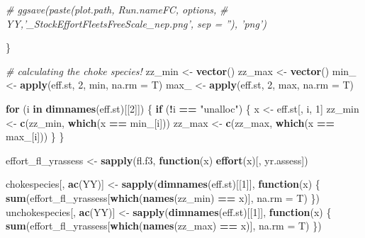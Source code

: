 \documentclass[
]{article}
\newenvironment{Shaded}{\begin{snugshade}}{\end{snugshade}}
\newcommand{\CommentTok}[1]{\textcolor[rgb]{0.56,0.35,0.01}{\textit{#1}}}
\newcommand{\ControlFlowTok}[1]{\textcolor[rgb]{0.13,0.29,0.53}{\textbf{#1}}}
\newcommand{\DataTypeTok}[1]{\textcolor[rgb]{0.13,0.29,0.53}{#1}}
\newcommand{\DecValTok}[1]{\textcolor[rgb]{0.00,0.00,0.81}{#1}}
\newcommand{\KeywordTok}[1]{\textcolor[rgb]{0.13,0.29,0.53}{\textbf{#1}}}
\newcommand{\NormalTok}[1]{#1}
\newcommand{\OperatorTok}[1]{\textcolor[rgb]{0.81,0.36,0.00}{\textbf{#1}}}
\newcommand{\StringTok}[1]{\textcolor[rgb]{0.31,0.60,0.02}{#1}}
\begin{document}
\begin{Shaded}
\begin{Highlighting}[]
            \CommentTok{# ggsave(paste(plot.path, Run.nameFC, options,}
            \CommentTok{# YY,'_StockEffortFleetsFreeScale_nep.png', sep = ''), 'png')}
            
\NormalTok{        \}}
        
        
        
        \CommentTok{# calculating the choke species!}
\NormalTok{        zz_min <-}\StringTok{ }\KeywordTok{vector}\NormalTok{()}
\NormalTok{        zz_max <-}\StringTok{ }\KeywordTok{vector}\NormalTok{()}
\NormalTok{        min_ <-}\StringTok{ }\KeywordTok{apply}\NormalTok{(eff.st, }\DecValTok{2}\NormalTok{, min, }\DataTypeTok{na.rm =}\NormalTok{ T)}
\NormalTok{        max_ <-}\StringTok{ }\KeywordTok{apply}\NormalTok{(eff.st, }\DecValTok{2}\NormalTok{, max, }\DataTypeTok{na.rm =}\NormalTok{ T)}
        
        \ControlFlowTok{for}\NormalTok{ (i }\ControlFlowTok{in} \KeywordTok{dimnames}\NormalTok{(eff.st)[[}\DecValTok{2}\NormalTok{]]) \{}
            \ControlFlowTok{if}\NormalTok{ (}\OperatorTok{!}\NormalTok{i }\OperatorTok{==}\StringTok{ "unalloc"}\NormalTok{) \{}
\NormalTok{                x <-}\StringTok{ }\NormalTok{eff.st[, i, }\DecValTok{1}\NormalTok{]}
\NormalTok{                zz_min <-}\StringTok{ }\KeywordTok{c}\NormalTok{(zz_min, }\KeywordTok{which}\NormalTok{(x }\OperatorTok{==}\StringTok{ }\NormalTok{min_[i]))}
\NormalTok{                zz_max <-}\StringTok{ }\KeywordTok{c}\NormalTok{(zz_max, }\KeywordTok{which}\NormalTok{(x }\OperatorTok{==}\StringTok{ }\NormalTok{max_[i]))}
\NormalTok{            \}}
\NormalTok{        \}}
        
\NormalTok{        effort_fl_yrassess <-}\StringTok{ }\KeywordTok{sapply}\NormalTok{(fl.f3, }\ControlFlowTok{function}\NormalTok{(x) }\KeywordTok{effort}\NormalTok{(x)[, yr.assess])}
        
\NormalTok{        chokespecies[, }\KeywordTok{ac}\NormalTok{(YY)] <-}\StringTok{ }\KeywordTok{sapply}\NormalTok{(}\KeywordTok{dimnames}\NormalTok{(eff.st)[[}\DecValTok{1}\NormalTok{]], }\ControlFlowTok{function}\NormalTok{(x) \{}
            \KeywordTok{sum}\NormalTok{(effort_fl_yrassess[}\KeywordTok{which}\NormalTok{(}\KeywordTok{names}\NormalTok{(zz_min) }\OperatorTok{==}\StringTok{ }\NormalTok{x)], }\DataTypeTok{na.rm =}\NormalTok{ T)}
\NormalTok{        \})}
\NormalTok{        unchokespecies[, }\KeywordTok{ac}\NormalTok{(YY)] <-}\StringTok{ }\KeywordTok{sapply}\NormalTok{(}\KeywordTok{dimnames}\NormalTok{(eff.st)[[}\DecValTok{1}\NormalTok{]], }\ControlFlowTok{function}\NormalTok{(x) \{}
            \KeywordTok{sum}\NormalTok{(effort_fl_yrassess[}\KeywordTok{which}\NormalTok{(}\KeywordTok{names}\NormalTok{(zz_max) }\OperatorTok{==}\StringTok{ }\NormalTok{x)], }\DataTypeTok{na.rm =}\NormalTok{ T)}
\NormalTok{        \})}
        

\end{Highlighting}
\end{Shaded}
\end{document}
